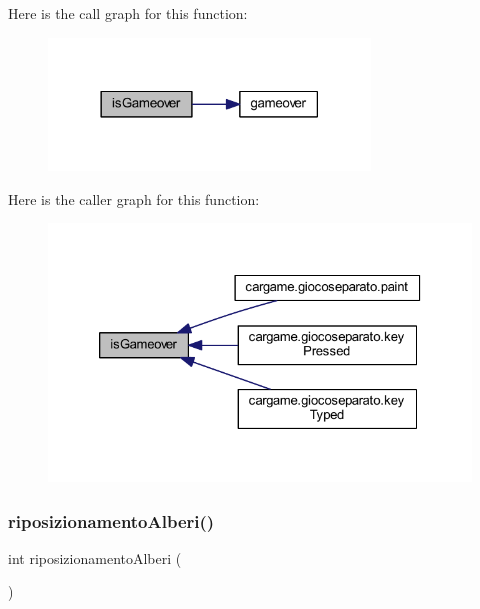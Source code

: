 Here is the call graph for this function\+:
\nopagebreak
\begin{figure}[H]
\begin{center}
\leavevmode
\includegraphics[width=242pt]{classcargame_1_1condivisa_ae61fc75224a904d7267bf6637a5afce2_cgraph}
\end{center}
\end{figure}
Here is the caller graph for this function\+:
\nopagebreak
\begin{figure}[H]
\begin{center}
\leavevmode
\includegraphics[width=326pt]{classcargame_1_1condivisa_ae61fc75224a904d7267bf6637a5afce2_icgraph}
\end{center}
\end{figure}
\mbox{\label{classcargame_1_1condivisa_ad8fe09dd7b1a7984263e49555b38e19d}} 
\subsubsection{\texorpdfstring{riposizionamento\+Alberi()}{riposizionamentoAlberi()}}
{\footnotesize\ttfamily int riposizionamento\+Alberi (\begin{DoxyParamCaption}{ }\end{DoxyParamCaption})}



